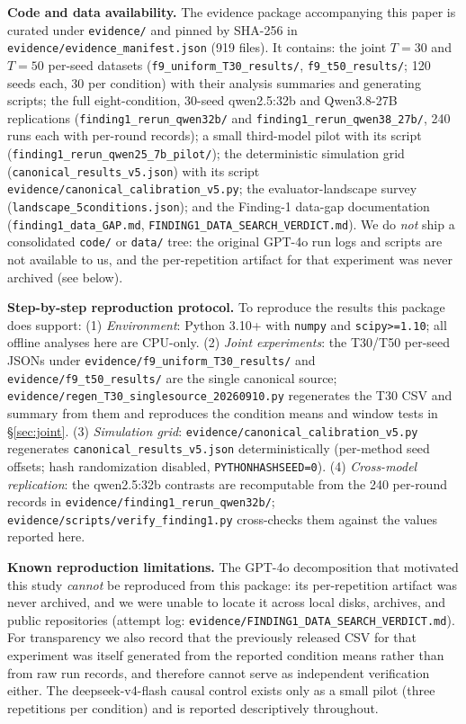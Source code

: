 \documentclass[11pt]{article}
\theoremstyle{definition}
\theoremstyle{remark}
\begin{document}
\textbf{Code and data availability.} The evidence package accompanying this paper is curated under \texttt{evidence/} and pinned by SHA-256 in \texttt{evidence/evidence\_manifest.json} (919 files). It contains: the joint $T{=}30$ and $T{=}50$ per-seed datasets (\texttt{f9\_uniform\_T30\_results/}, \texttt{f9\_t50\_results/}; 120 seeds each, 30 per condition) with their analysis summaries and generating scripts; the full eight-condition, 30-seed qwen2.5:32b and Qwen3.8-27B replications (\texttt{finding1\_rerun\_qwen32b/} and \texttt{finding1\_rerun\_qwen38\_27b/}, 240 runs each with per-round records); a small third-model pilot with its script (\texttt{finding1\_rerun\_qwen25\_7b\_pilot/}); the deterministic simulation grid (\texttt{canonical\_results\_v5.json}) with its script \texttt{evidence/canonical\_calibration\_v5.py}; the evaluator-landscape survey (\texttt{landscape\_5conditions.json}); and the Finding-1 data-gap documentation (\texttt{finding1\_data\_GAP.md}, \texttt{FINDING1\_DATA\_SEARCH\_VERDICT.md}). We do \emph{not} ship a consolidated \texttt{code/} or \texttt{data/} tree: the original GPT-4o run logs and scripts are not available to us, and the per-repetition artifact for that experiment was never archived (see below).

\textbf{Step-by-step reproduction protocol.} To reproduce the results this package does support: (1) \textit{Environment}: Python 3.10+ with \texttt{numpy} and \texttt{scipy>=1.10}; all offline analyses here are CPU-only. (2) \textit{Joint experiments}: the T30/T50 per-seed JSONs under \texttt{evidence/f9\_uniform\_T30\_results/} and \texttt{evidence/f9\_t50\_results/} are the single canonical source; \texttt{evidence/regen\_T30\_singlesource\_20260910.py} regenerates the T30 CSV and summary from them and reproduces the condition means and window tests in \S\ref{sec:joint}. (3) \textit{Simulation grid}: \texttt{evidence/canonical\_calibration\_v5.py} regenerates \texttt{canonical\_results\_v5.json} deterministically (per-method seed offsets; hash randomization disabled, \texttt{PYTHONHASHSEED=0}). (4) \textit{Cross-model replication}: the qwen2.5:32b contrasts are recomputable from the 240 per-round records in \texttt{evidence/finding1\_rerun\_qwen32b/}; \texttt{evidence/scripts/verify\_finding1.py} cross-checks them against the values reported here.

\textbf{Known reproduction limitations.} The GPT-4o decomposition that motivated this study \emph{cannot} be reproduced from this package: its per-repetition artifact was never archived, and we were unable to locate it across local disks, archives, and public repositories (attempt log: \texttt{evidence/FINDING1\_DATA\_SEARCH\_VERDICT.md}). For transparency we also record that the previously released CSV for that experiment was itself generated from the reported condition means rather than from raw run records, and therefore cannot serve as independent verification either. The deepseek-v4-flash causal control exists only as a small pilot (three repetitions per condition) and is reported descriptively throughout.
\end{document}

